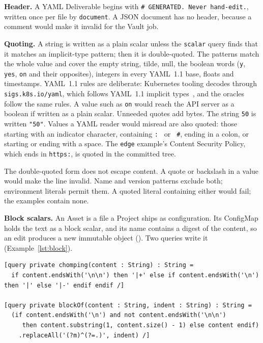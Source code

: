 \textbf{Header.} A YAML Deliverable begins with \texttt{\# GENERATED. Never hand-edit.},
written once per file by \texttt{document}. A JSON document has no header, because
a comment would make it invalid for the Vault job.

\textbf{Quoting.} A string is written as a plain scalar unless the \texttt{scalar} query finds that it matches an implicit-type pattern; then it is double-quoted. The patterns
match the whole value and cover the empty string, tilde, null, the boolean words
(\texttt{y}, \texttt{yes}, \texttt{on} and their opposites), integers in every
YAML~1.1 base, floats and timestamps.
YAML~1.1 rules are deliberate: Kubernetes tooling decodes through
\texttt{sigs.k8s.io/yaml}, which follows YAML~1.1 implicit types~\cite{yaml11}, and the oracles follow
the same rules.
A value such as \texttt{on} would reach the API server as a boolean if written as a plain scalar.
Unneeded quotes add bytes. The string \texttt{50} is written \texttt{"50"}.
Values a YAML reader would misread are also quoted: those starting with an indicator
character, containing \texttt{:~} or \texttt{~\#}, ending in a colon, or starting or
ending with a space. The \texttt{edge} example's Content Security Policy, which ends in \texttt{https:},
is quoted in the committed tree.

The double-quoted form does not escape content. A quote or backslash in a value
would make the line invalid. Name and version patterns exclude both; environment
literals permit them. A quoted literal containing either would fail; the examples contain none.

\textbf{Block scalars.} An Asset is a file a Project ships as configuration. Its
ConfigMap holds the text as a block scalar, and its name contains a digest of the
content, so an edit produces a new immutable object
(). Two queries
write it (Example~\ref{lst:block}).

\begin{lstlisting}[style=report, language=acceleo, caption={The Block Scalar Queries}, label={lst:block}]
[query private chomping(content : String) : String =
  if content.endsWith('\n\n') then '|+' else if content.endsWith('\n') then '|' else '|-' endif endif /]

[query private blockOf(content : String, indent : String) : String =
  (if content.endsWith('\n') and not content.endsWith('\n\n')
     then content.substring(1, content.size() - 1) else content endif)
    .replaceAll('(?m)^(?=.)', indent) /]
\end{lstlisting}


